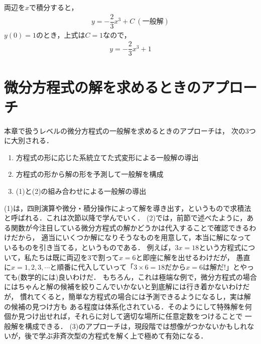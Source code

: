 両辺を$x$で積分すると，
\begin{align}
 y = -\dfrac{2}{3}x^3 + C~(一般解) 
\end{align}
$y(0)=1$のとき，上式は$C=1$なので，
\begin{align}
  y = -\dfrac{2}{3}x^3 + 1 
\end{align}
%
\newpage
%
\section{微分方程式の解を求めるときのアプローチ}
%
本章で扱うレベルの微分方程式の一般解を求めるときのアプローチは，
次の3つに大別される．
\begin{enumerate}[(1)]
  \item 方程式の形に応じた系統立てた式変形による一般解の導出
  \item 方程式の形から解の形を予測して一般解を構成
  \item (1)と(2)の組み合わせによる一般解の導出 
\end{enumerate}
%
(1)は，四則演算や微分・積分操作によって解を導き出す，というもので求積法と呼ばれる．これは次節以降で学んでいく．
(2)では，前節で述べたように，ある関数が今注目している微分方程式の解かどうかは代入することで確認できるわけだから，
適当にいくつか解になりそうなものを用意して，本当に解になっているものを引き当てる，というものである．
例えば，$3x=18$という方程式について，私たちは既に両辺を3で割って$x=6$と即座に解を出せるわけだが，
愚直に$x=1,2,3,\cdots$と順番に代入していって「$3\times 6=18$だから$x=6$は解だ!」とやっても(数学的には)良いわけだ．
もちろん，これは極端な例で，微分方程式の場合にはちゃんと解の候補を絞りこんでいかないと到底解には行き着かないわけだが，
慣れてくると，簡単な方程式の場合には予測できるようになるし，実は解の候補の見つけ方も
ある程度は体系化されている．そのようにして特殊解を何個か見つけ出せれば，それらに対して適切な場所に任意定数をつけることで
一般解を構成できる．
(3)のアプローチは，現段階では想像がつかないかもしれないが，後で学ぶ非斉次型の方程式を解く上で極めて有効になる．

